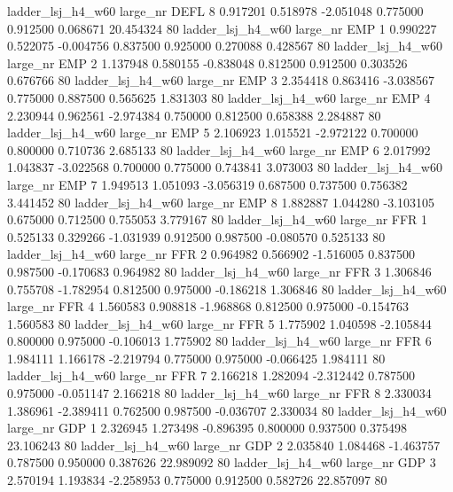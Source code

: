   ladder_lsj_h4_w60   large_nr     DEFL                 8  0.917201  0.518978  -2.051048 0.775000 0.912500  0.068671   20.454324 80
  ladder_lsj_h4_w60   large_nr      EMP                 1  0.990227  0.522075  -0.004756 0.837500 0.925000  0.270088    0.428567 80
  ladder_lsj_h4_w60   large_nr      EMP                 2  1.137948  0.580155  -0.838048 0.812500 0.912500  0.303526    0.676766 80
  ladder_lsj_h4_w60   large_nr      EMP                 3  2.354418  0.863416  -3.038567 0.775000 0.887500  0.565625    1.831303 80
  ladder_lsj_h4_w60   large_nr      EMP                 4  2.230944  0.962561  -2.974384 0.750000 0.812500  0.658388    2.284887 80
  ladder_lsj_h4_w60   large_nr      EMP                 5  2.106923  1.015521  -2.972122 0.700000 0.800000  0.710736    2.685133 80
  ladder_lsj_h4_w60   large_nr      EMP                 6  2.017992  1.043837  -3.022568 0.700000 0.775000  0.743841    3.073003 80
  ladder_lsj_h4_w60   large_nr      EMP                 7  1.949513  1.051093  -3.056319 0.687500 0.737500  0.756382    3.441452 80
  ladder_lsj_h4_w60   large_nr      EMP                 8  1.882887  1.044280  -3.103105 0.675000 0.712500  0.755053    3.779167 80
  ladder_lsj_h4_w60   large_nr      FFR                 1  0.525133  0.329266  -1.031939 0.912500 0.987500 -0.080570    0.525133 80
  ladder_lsj_h4_w60   large_nr      FFR                 2  0.964982  0.566902  -1.516005 0.837500 0.987500 -0.170683    0.964982 80
  ladder_lsj_h4_w60   large_nr      FFR                 3  1.306846  0.755708  -1.782954 0.812500 0.975000 -0.186218    1.306846 80
  ladder_lsj_h4_w60   large_nr      FFR                 4  1.560583  0.908818  -1.968868 0.812500 0.975000 -0.154763    1.560583 80
  ladder_lsj_h4_w60   large_nr      FFR                 5  1.775902  1.040598  -2.105844 0.800000 0.975000 -0.106013    1.775902 80
  ladder_lsj_h4_w60   large_nr      FFR                 6  1.984111  1.166178  -2.219794 0.775000 0.975000 -0.066425    1.984111 80
  ladder_lsj_h4_w60   large_nr      FFR                 7  2.166218  1.282094  -2.312442 0.787500 0.975000 -0.051147    2.166218 80
  ladder_lsj_h4_w60   large_nr      FFR                 8  2.330034  1.386961  -2.389411 0.762500 0.987500 -0.036707    2.330034 80
  ladder_lsj_h4_w60   large_nr      GDP                 1  2.326945  1.273498  -0.896395 0.800000 0.937500  0.375498   23.106243 80
  ladder_lsj_h4_w60   large_nr      GDP                 2  2.035840  1.084468  -1.463757 0.787500 0.950000  0.387626   22.989092 80
  ladder_lsj_h4_w60   large_nr      GDP                 3  2.570194  1.193834  -2.258953 0.775000 0.912500  0.582726   22.857097 80
